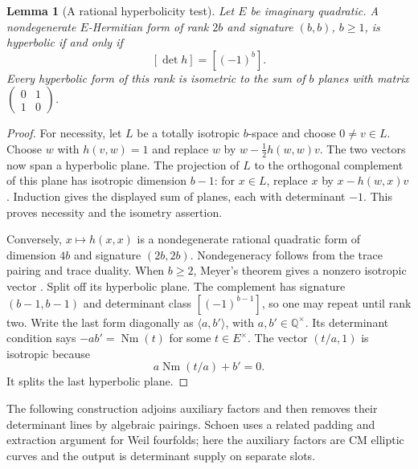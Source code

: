 \documentclass[11pt]{article}
\newcommand{\Q}{\mathbb Q}
\newtheorem{lemma}[theorem]{Lemma}
\numberwithin{equation}{section}
\begin{document}
\begin{lemma}[A rational hyperbolicity test]
\label{p3ab:hyperbolic}
Let \(E\) be imaginary quadratic.  A nondegenerate \(E\)-Hermitian
form of rank \(2b\) and signature \((b,b)\), \(b\geq1\), is
hyperbolic if and only if
\[
 [\det h]=[(-1)^b].
\]
Every hyperbolic form of this rank is isometric to the sum of \(b\)
planes with matrix
\(\left(\begin{smallmatrix}0&1\\1&0\end{smallmatrix}\right)\).
\end{lemma}

\begin{proof}
For necessity, let \(L\) be a totally isotropic \(b\)-space and
choose \(0\ne v\in L\).  Choose \(w\) with
\(h(v,w)=1\) and replace \(w\) by
\(w-\tfrac12h(w,w)v\).  The two vectors now span a hyperbolic
plane.  The projection of \(L\) to the orthogonal complement of
this plane has isotropic dimension \(b-1\): for \(x\in L\), replace \(x\) by
\(x-h(w,x)v\).  Induction gives the displayed sum of planes,
each with determinant \(-1\).  This proves necessity and the
isometry assertion.

Conversely, \(x\mapsto h(x,x)\) is a nondegenerate rational quadratic
form of dimension \(4b\) and signature \((2b,2b)\).  Nondegeneracy
follows from the trace pairing and trace duality.  When \(b\geq2\),
Meyer's theorem gives a nonzero isotropic vector
\cite[Corollary~3.3.4]{PetersSterk2024QuadraticForms}.
Split off its hyperbolic plane.  The complement has signature
\((b-1,b-1)\) and determinant class \([(-1)^{b-1}]\), so one
may repeat until rank two.  Write the last form diagonally as
\(\langle a,b'\rangle\), with \(a,b'\in\Q^\times\).  Its
determinant condition says \(-ab'=\operatorname{Nm}(t)\) for some
\(t\in E^\times\).  The vector \((t/a,1)\) is isotropic because
\[
 a\operatorname{Nm}(t/a)+b'=0.
\]
It splits the last hyperbolic plane.
\end{proof}

The following construction adjoins auxiliary factors and then removes
their determinant lines by algebraic pairings. Schoen
\cite[Proposition~10]{Schoen1998Addendum} uses a related padding and
extraction argument for Weil fourfolds; here the auxiliary factors are
CM elliptic curves and the output is determinant supply on separate slots.
\end{document}
